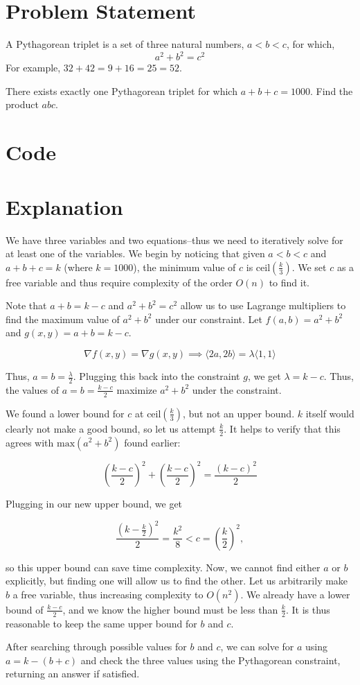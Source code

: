 \documentclass{article}
\begin{document}
    
\section{Problem Statement}

A Pythagorean triplet is a set of three natural numbers, $a < b < c$, for which,
$$a^2 + b^2 = c^2$$
For example, $32 + 42 = 9 + 16 = 25 = 52$.

There exists exactly one Pythagorean triplet for which $a + b + c = 1000$.
Find the product $abc$.

\section{Code}



\section{Explanation}

We have three variables and two equations--thus we need to iteratively solve for at least one of the variables.
We begin by noticing that given $a<b<c$ and $a+b+c=k$ (where $k=1000$), the minimum value of $c$ is $\mathrm{ceil}(\frac{k}{3})$.
We set $c$ as a free variable and thus require complexity of the order $O(n)$ to find it.

Note that $a+b=k-c$ and $a^2+b^2=c^2$ allow us to use Lagrange multipliers to find the maximum value of $a^2+b^2$ under our constraint.
Let $f(a,b)=a^2+b^2$ and $g(x,y)=a+b=k-c$.

$$\nabla f(x,y)=\nabla g(x,y)\implies \langle 2a,2b\rangle = \lambda \langle 1, 1\rangle$$

Thus, $a=b=\frac{\lambda}{2}$. Plugging this back into the constraint $g$, we get $\lambda=k-c$.
Thus, the values of $a=b=\frac{k-c}{2}$ maximize $a^2+b^2$ under the constraint.

We found a lower bound for $c$ at $\mathrm{ceil}(\frac{k}{3})$, but not an upper bound. $k$ itself would clearly not make a good bound,
so let us attempt $\frac{k}{2}$. It helps to verify that this agrees with $\mathrm{max}(a^2+b^2)$ found earlier:

$$\left(\frac{k-c}{2}\right)^2+\left(\frac{k-c}{2}\right)^2=\frac{(k-c)^2}{2}$$

Plugging in our new upper bound, we get

$$\frac{(k-\frac{k}{2})^2}{2}=\frac{k^2}{8}<c=\left(\frac{k}{2}\right)^2,$$

so this upper bound can save time complexity. Now, we cannot find either $a$ or $b$
explicitly, but finding one will allow us to find the other. Let us arbitrarily make $b$ a free variable, 
thus increasing complexity to $O(n^2)$. We already have a lower bound of $\frac{k-c}{2}$, and we know the higher bound must be less than $\frac{k}{2}$.
It is thus reasonable to keep the same upper bound for $b$ and $c$.

After searching through possible values for $b$ and $c$, we can solve for $a$ using
$a=k-(b+c)$ and check the three values using the Pythagorean constraint, returning an answer if satisfied.
\end{document}
